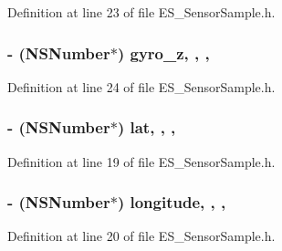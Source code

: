 Definition at line 23 of file E\+S\+\_\+\+Sensor\+Sample.\+h.

\hypertarget{interface_e_s___sensor_sample_a0b08c8967ab6bac73d9822c515c51315}{
\subsubsection[{gyro\+\_\+z}]{\setlength{\rightskip}{0pt plus 5cm}-\/ (N\+S\+Number$\ast$) gyro\+\_\+z\hspace{0.3cm}{\ttfamily [read]}, {\ttfamily [write]}, {\ttfamily [nonatomic]}, {\ttfamily [retain]}}}\label{interface_e_s___sensor_sample_a0b08c8967ab6bac73d9822c515c51315}


Definition at line 24 of file E\+S\+\_\+\+Sensor\+Sample.\+h.

\hypertarget{interface_e_s___sensor_sample_a95561a4b148e9898ca9666373671569f}{
\subsubsection[{lat}]{\setlength{\rightskip}{0pt plus 5cm}-\/ (N\+S\+Number$\ast$) lat\hspace{0.3cm}{\ttfamily [read]}, {\ttfamily [write]}, {\ttfamily [nonatomic]}, {\ttfamily [retain]}}}\label{interface_e_s___sensor_sample_a95561a4b148e9898ca9666373671569f}


Definition at line 19 of file E\+S\+\_\+\+Sensor\+Sample.\+h.

\hypertarget{interface_e_s___sensor_sample_af28d24dfa765e3ac17cb633d48c1c742}{
\subsubsection[{longitude}]{\setlength{\rightskip}{0pt plus 5cm}-\/ (N\+S\+Number$\ast$) longitude\hspace{0.3cm}{\ttfamily [read]}, {\ttfamily [write]}, {\ttfamily [nonatomic]}, {\ttfamily [retain]}}}\label{interface_e_s___sensor_sample_af28d24dfa765e3ac17cb633d48c1c742}


Definition at line 20 of file E\+S\+\_\+\+Sensor\+Sample.\+h.

